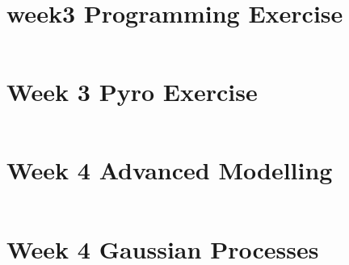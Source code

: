 \newpage
\section{week3 Programming Exercise}
\label{sec:week3:code:exercise}
\inputminted{Python}{../src/week3_exercise.py}

\newpage
\section{Week 3 Pyro Exercise}
\label{sec:week3:code:pyro}
\inputminted{Python}{../src/week3_pyro.py}

\newpage
\section{Week 4 Advanced Modelling}
\label{sec:week4:code:modelling}
\inputminted{Python}{../src/Iris_NN_SVI_Solution.py}

\newpage
\section{Week 4 Gaussian Processes}
\label{sec:week4:code:gp}
\inputminted{Python}{../src/week4_gp.py}
